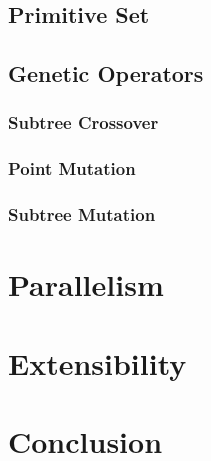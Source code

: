     \subsection{Primitive Set}
    \label{sec:keen:gp:primitive_set}
      \Blindtext
    \subsection{Genetic Operators}
    \label{sec:keen:gp:operators}
      \subsubsection{Subtree Crossover}
      \label{sec:keen:gp:operators:crossover:subtree}
        \Blindtext
      \subsubsection{Point Mutation}
      \label{sec:keen:gp:operators:mutation:point}
        \Blindtext
      \subsubsection{Subtree Mutation}
      \label{sec:keen:operators:mutation:subtree}
        \Blindtext
  \section{Parallelism}
  \label{sec:parallelism}
    \Blindtext
  \section{Extensibility}
  \label{sec:extensibility}
    \Blindtext
  \section{Conclusion}
  \label{sec:conclusion}
    \Blindtext
